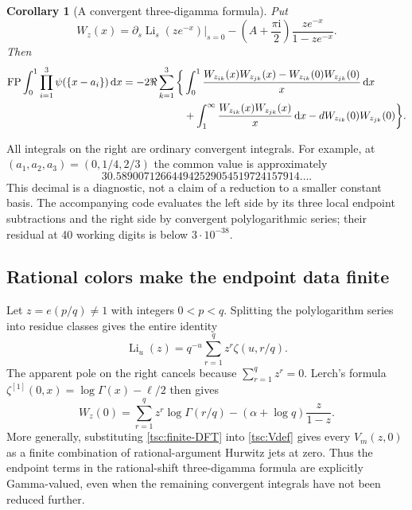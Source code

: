 \documentclass[11pt]{article}
\numberwithin{equation}{section}
\newtheorem{corollary}[theorem]{Corollary}
\theoremstyle{definition}\newtheorem{definition}[theorem]{Definition}
\theoremstyle{remark}\newtheorem{remark}[theorem]{Remark}
\DeclareMathOperator{\Li}{Li}
\DeclareMathOperator{\FP}{FP}
\newcommand{\ii}{\mathrm i}
\newcommand{\dd}{\,\mathrm d}
\begin{document}
\begin{corollary}[A convergent three-digamma formula]\label{tsc:psi-mellin}
Put
\[
 W_z(x)=\left.\partial_s\Li_s(ze^{-x})\right|_{s=0}
            -\left(A+\frac{\pi\ii}{2}\right)\frac{ze^{-x}}{1-ze^{-x}}.
\]
Then
\begin{align}\label{tsc:psi-integrals}
 \FP\int_0^1\prod_{i=1}^3\psi(\{x-a_i\})\dd x
 =-2\Re\sum_{k=1}^3\bigg\{&
  \int_0^1\frac{W_{z_{ik}}(x)W_{z_{jk}}(x)
                 -W_{z_{ik}}(0)W_{z_{jk}}(0)}x\dd x\notag\\
 &+\int_1^\infty\frac{W_{z_{ik}}(x)W_{z_{jk}}(x)}x\dd x
   -dW_{z_{ik}}(0)W_{z_{jk}}(0)\bigg\}.
\end{align}
\end{corollary}
All integrals on the right are ordinary convergent integrals. For example,
at $(a_1,a_2,a_3)=(0,1/4,2/3)$ the common value is approximately
\[
 30.589007126644942529054519724157914\ldots.
\]
This decimal is a diagnostic, not a claim of a reduction to a smaller
constant basis. The accompanying code evaluates the left side by its
three local endpoint subtractions and the right side by convergent
polylogarithmic series; their residual at 40 working digits is below
$3\cdot10^{-38}$.

\subsection{Rational colors make the endpoint data finite}
Let $z=e(p/q)\ne1$ with integers $0<p<q$. Splitting the polylogarithm
series into residue classes gives the entire identity
\begin{equation}\label{tsc:finite-DFT}
 \Li_u(z)=q^{-u}\sum_{r=1}^q z^r\zeta(u,r/q).
\end{equation}
The apparent pole on the right cancels because $\sum_{r=1}^qz^r=0$.
Lerch's formula $\zeta^{[1]}(0,x)=\log\Gamma(x)-\ell/2$ then gives
\begin{equation}\label{tsc:W-boundary}
 W_z(0)=\sum_{r=1}^qz^r\log\Gamma(r/q)
       -(\alpha+\log q)\frac{z}{1-z}.
\end{equation}
More generally, substituting \eqref{tsc:finite-DFT} into \eqref{tsc:Vdef}
gives every $V_m(z,0)$ as a finite combination of rational-argument
Hurwitz jets at zero. Thus the endpoint terms in the rational-shift
three-digamma formula are explicitly Gamma-valued, even when the remaining
convergent integrals have not been reduced further.


\end{document}
